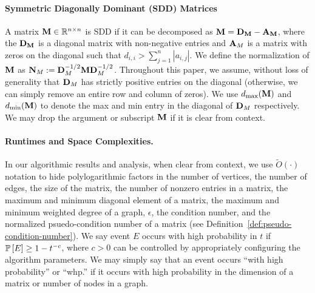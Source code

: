 \paragraph{Symmetric Diagonally Dominant (SDD) Matrices}{
A matrix $\mathbf{M} \in \mathbb{R}^{n \times n}$ is SDD if it can be decomposed as $\mathbf{M} = {\mathbf{D}}_{\mathbf{M}} - {\mathbf{A}}_{\mathbf{M}}$, where the ${\mathbf{D}}_{\mathbf{M}}$ is a diagonal matrix with non-negative entries and ${\mathbf{A}}_{M}$ is a matrix with zeros on the diagonal such that $d_{i,i} > \sum_{j = 1}^n |a_{i,j}|$. We define the normalization of $\mathbf{M}$ as $\mathbf{N}_{M} := {\mathbf{D}}_{M}^{-1/2}\mathbf{M} {\mathbf{D}}_{M}^{-1/2}$. Throughout this paper, we assume, without loss of generality that $\mathbf{D}_M$ has strictly positive entries on the diagonal (otherwise, we can simply remove an entire row and column of zeros). We use ${d_{\max}}(\mathbf{M})$ and ${d_{\min}}(\mathbf{M})$ to denote the max and min entry in the diagonal of $\mathbf{D}_M$ respectively. We may drop the argument or subscript $\mathbf{M}$ if it is clear from context. }

\paragraph{Runtimes and Space Complexities.} {In our algorithmic results and analysis, when clear from context, we use $\widetilde{O}(\cdot)$ notation to hide polylogarithmic factors in the number of vertices, the number of edges, the size of the matrix, the number of nonzero entries in a matrix, the maximum and minimum diagonal element of a matrix, the maximum and minimum weighted degree of a graph, $\epsilon$, the condition number, and the normalized psuedo-condition number of a matrix (see Definition~\ref{def:pseudo-condition-number}). We say event $E$ occurs with high probability in $t$ if $\mathbb{P} \left[ E \right] \geq 1 - t^{-c}$, where $c> 0$ can be controlled by appropriately configuring the algorithm parameters. We may simply say that an event occurs ``with high probability'' or ``whp.'' if it occurs with high probability in the dimension of a matrix or number of nodes in a graph.} 
